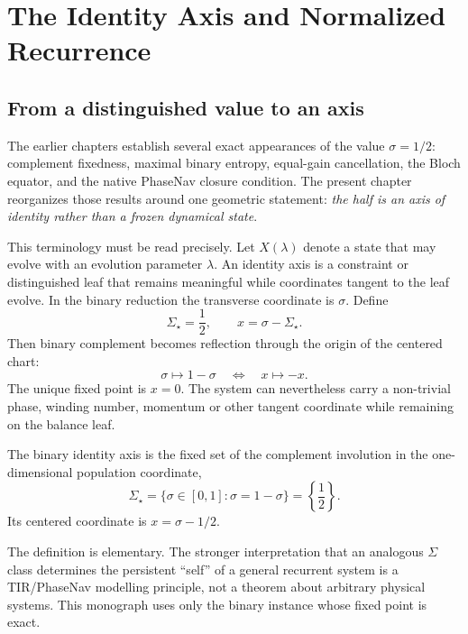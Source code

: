 \chapter{The Identity Axis and Normalized Recurrence}
\label{chap:identity-axis}

\section{From a distinguished value to an axis}

The earlier chapters establish several exact appearances of the value
$\sigma=1/2$: complement fixedness, maximal binary entropy, equal-gain
cancellation, the Bloch equator, and the native PhaseNav closure condition.
The present chapter reorganizes those results around one geometric statement:
\emph{the half is an axis of identity rather than a frozen dynamical state}.

This terminology must be read precisely.  Let $X(\lambda)$ denote a state that
may evolve with an evolution parameter $\lambda$.  An identity axis is a
constraint or distinguished leaf that remains meaningful while coordinates
tangent to the leaf evolve.  In the binary reduction the transverse coordinate
is $\sigma$.  Define
\begin{equation}
 \Sigma_\star=\frac12,
 \qquad
 x=\sigma-\Sigma_\star.
 \label{eq:identity-centered-sigma}
\end{equation}
Then binary complement becomes reflection through the origin of the centered
chart:
\begin{equation}
 \sigma\mapsto1-\sigma
 \quad\Longleftrightarrow\quad
 x\mapsto-x.
 \label{eq:identity-reflection}
\end{equation}
The unique fixed point is $x=0$.  The system can nevertheless carry a
non-trivial phase, winding number, momentum or other tangent coordinate while
remaining on the balance leaf.

\begin{definition}
\label{def:binary-identity-axis}
The binary identity axis is the fixed set of the complement involution in the
one-dimensional population coordinate,
\begin{equation}
 \Sigma_\star
 =\{\sigma\in[0,1]:\sigma=1-\sigma\}
 =\left\{\frac12\right\}.
\end{equation}
Its centered coordinate is $x=\sigma-1/2$.
\end{definition}

The definition is elementary.  The stronger interpretation that an analogous
$\Sigma$ class determines the persistent ``self'' of a general recurrent
system is a TIR/PhaseNav modelling principle, not a theorem about arbitrary
physical systems.  This monograph uses only the binary instance whose fixed
point is exact.

